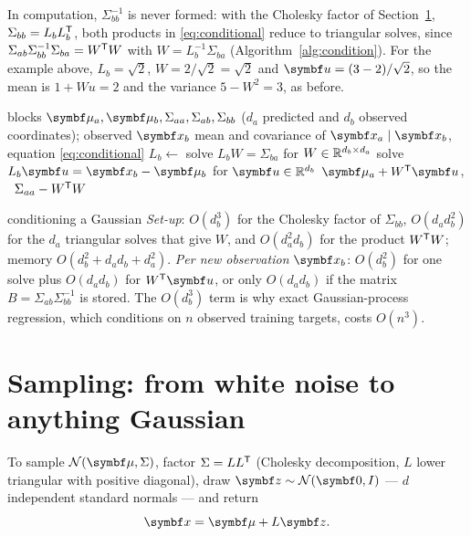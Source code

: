 \documentclass[11pt]{article}
\begin{document}
In computation, $\Sigma_{bb}^{-1}$ is never formed: with the Cholesky factor of Section~\ref{sec:sampling},
$\Sigma_{bb} = L_bL_b^{\mathsf{T}}$, both products in \eqref{eq:conditional} reduce to triangular solves, since
$\Sigma_{ab}\Sigma_{bb}^{-1}\Sigma_{ba} = W^{\mathsf{T}} W$ with $W = L_b^{-1}\Sigma_{ba}$ (Algorithm~\ref{alg:condition}). For
the example above, $L_b = \sqrt2$, $W = 2/\sqrt2 = \sqrt2$ and $\vect{u} = (3 - 2)/\sqrt2$, so the mean is $1 + W u = 2$
and the variance $5 - W^2 = 3$, as before.

\begin{algorithm}[htbp]
\caption{Conditioning a Gaussian on observed coordinates $\x_b$}\label{alg:condition}
\begin{algorithmic}[1]
\Require blocks $\vmu_a, \vmu_b, \Sigma_{aa}, \Sigma_{ab}, \Sigma_{bb}$ ($d_a$ predicted and $d_b$ observed coordinates); observed $\x_b$
\Ensure mean and covariance of $\x_a \mid \x_b$, equation \eqref{eq:conditional}
  \State $L_b \gets$  
  \State solve $L_b W = \Sigma_{ba}$ for $W \in \mathbb{R}^{d_b \times d_a}$ 
  \State solve $L_b \vect{u} = \x_b - \vmu_b$ for $\vect{u} \in \R^{d_b}$
  \State \Return $\vmu_a + W\T\vect{u}$, \ $\Sigma_{aa} - W^{\mathsf{T}} W$
\EndFunction
\end{algorithmic}
\end{algorithm}

\begin{runtime}{conditioning a Gaussian}
\emph{Set-up}: $O(d_b^3)$ for the Cholesky factor of $\Sigma_{bb}$, $O(d_a d_b^2)$ for the $d_a$ triangular solves that
give $W$, and $O(d_a^2 d_b)$ for the product $W^{\mathsf{T}} W$; memory $O(d_b^2 + d_a d_b + d_a^2)$. \emph{Per new observation}
$\x_b$: $O(d_b^2)$ for one solve plus $O(d_a d_b)$ for $W\T\vect{u}$, or only $O(d_a d_b)$ if the matrix
$B = \Sigma_{ab}\Sigma_{bb}^{-1}$ is stored. The $O(d_b^3)$ term is why exact Gaussian-process regression, which
conditions on $n$ observed training targets, costs $O(n^3)$.
\end{runtime}

\section{Sampling: from white noise to anything Gaussian}\label{sec:sampling}

To sample $\Normal(\vmu, \Sigma)$, factor $\Sigma = LL^{\mathsf{T}}$ (Cholesky decomposition, $L$ lower triangular with positive
diagonal), draw $\vect{z} \sim \Normal(\vect{0}, I)$ --- $d$ independent standard normals --- and return
\begin{equation}\label{eq:reparam}
  \x = \vmu + L \vect{z}.
\end{equation}
\end{document}
